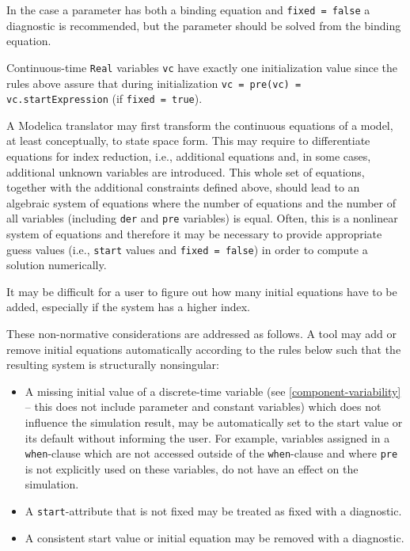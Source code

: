 \begin{nonnormative}
In the case a parameter has both a binding equation and \lstinline!fixed = false! a diagnostic is recommended, but the parameter should be solved from the binding equation.

Continuous-time \lstinline!Real! variables \lstinline!vc! have exactly one initialization value since the rules above assure that during initialization \lstinline!vc = pre(vc) = vc.startExpression! (if \lstinline!fixed = true!).

A Modelica translator may first transform the continuous equations of a model, at least conceptually, to state space form.
This may require to differentiate equations for index reduction, i.e., additional equations and, in some cases, additional unknown variables are introduced.
This whole set of equations, together with the additional constraints defined above, should lead to an algebraic system of equations where the number of equations and the number of all variables (including \lstinline!der! and \lstinline!pre! variables) is equal.
Often, this is a nonlinear system of equations and therefore it may be necessary to provide appropriate guess values (i.e., \lstinline!start! values and \lstinline!fixed = false!) in order to compute a solution numerically.

It may be difficult for a user to figure out how many initial equations have to be added, especially if the system has a higher index.
\end{nonnormative}

These non-normative considerations are addressed as follows.
A tool may add or remove initial equations automatically according to the rules below such that the resulting system is structurally nonsingular:
\begin{itemize}
\item A missing initial value of a discrete-time variable (see \cref{component-variability} -- this does not include parameter and constant variables) which does not influence the simulation result, may be automatically set to the start value or its default without informing the user.
For example, variables assigned in a \lstinline!when!-clause which are not accessed outside of the \lstinline!when!-clause and where \lstinline!pre! is not explicitly used on these variables, do not have an effect on the simulation.
\item A \lstinline!start!-attribute that is not fixed may be treated as fixed with a diagnostic.
\item A consistent start value or initial equation may be removed with a diagnostic.
\end{itemize}

